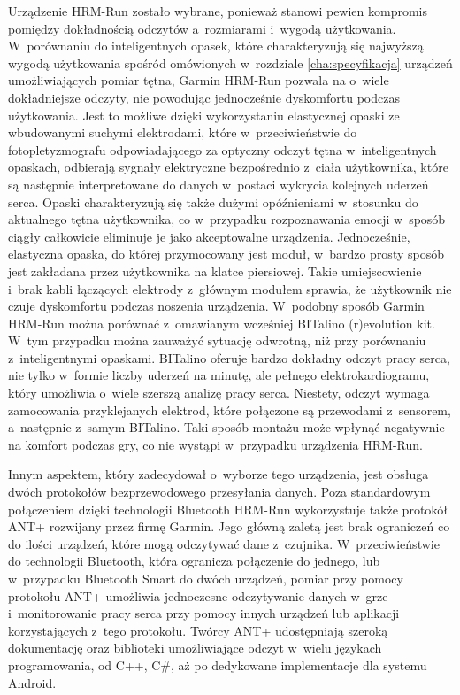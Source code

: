 Urządzenie HRM-Run zostało wybrane, ponieważ stanowi pewien kompromis pomiędzy dokładnością odczytów a~rozmiarami i~wygodą użytkowania. W~porównaniu do inteligentnych opasek, które charakteryzują się najwyższą wygodą użytkowania spośród omówionych w~rozdziale \ref{cha:specyfikacja} urządzeń umożliwiających pomiar tętna, Garmin HRM-Run pozwala na o~wiele dokładniejsze odczyty, nie powodując jednocześnie dyskomfortu podczas użytkowania. Jest to możliwe dzięki wykorzystaniu elastycznej opaski ze wbudowanymi suchymi elektrodami, które w~przeciwieństwie do fotopletyzmografu odpowiadającego za optyczny odczyt tętna w~inteligentnych opaskach, odbierają sygnały elektryczne bezpośrednio z~ciała użytkownika, które są następnie interpretowane do danych w~postaci wykrycia kolejnych uderzeń serca. Opaski charakteryzują się także dużymi opóźnieniami w~stosunku do aktualnego tętna użytkownika, co w~przypadku rozpoznawania emocji w~sposób ciągły całkowicie eliminuje je jako akceptowalne urządzenia. Jednocześnie, elastyczna opaska, do której przymocowany jest moduł, w~bardzo prosty sposób jest zakładana przez użytkownika na klatce piersiowej. Takie umiejscowienie i~brak kabli łączących elektrody z~głównym modułem sprawia, że użytkownik nie czuje dyskomfortu podczas noszenia urządzenia. W~podobny sposób Garmin HRM-Run można porównać z~omawianym wcześniej BITalino (r)evolution kit. W~tym przypadku można zauważyć sytuację odwrotną, niż przy porównaniu z~inteligentnymi opaskami. BITalino oferuje bardzo dokładny odczyt pracy serca, nie tylko w~formie liczby uderzeń na minutę, ale pełnego elektrokardiogramu, który umożliwia o~wiele szerszą analizę pracy serca. Niestety, odczyt wymaga zamocowania przyklejanych elektrod, które połączone są przewodami z~sensorem, a~następnie z~samym BITalino. Taki sposób montażu może wpłynąć negatywnie na komfort podczas gry, co nie wystąpi w~przypadku urządzenia HRM-Run.

Innym aspektem, który zadecydował o~wyborze tego urządzenia, jest obsługa dwóch protokołów bezprzewodowego przesyłania danych. Poza standardowym połączeniem dzięki technologii Bluetooth HRM-Run wykorzystuje także protokół ANT+ rozwijany przez firmę Garmin. Jego główną zaletą jest brak ograniczeń co do ilości urządzeń, które mogą odczytywać dane z~czujnika. W~przeciwieństwie do technologii Bluetooth, która ogranicza połączenie do jednego, lub w~przypadku Bluetooth Smart do dwóch urządzeń, pomiar przy pomocy protokołu ANT+ umożliwia jednoczesne odczytywanie danych w~grze i~monitorowanie pracy serca przy pomocy innych urządzeń lub aplikacji korzystających z~tego protokołu. Twórcy ANT+ udostępniają szeroką dokumentację oraz biblioteki umożliwiające odczyt w~wielu językach programowania, od C++, C\#, aż po dedykowane implementacje dla systemu Android.

